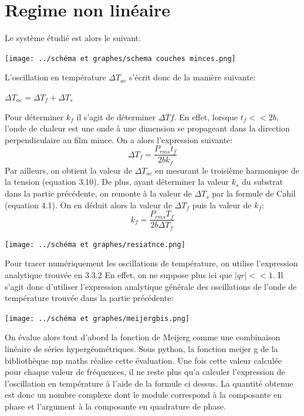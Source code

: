 \documentclass[10pt,a4paper]{report}
\begin{document}
\section{Regime non linéaire}
Le système étudié est alors le suivant:
\begin{center}
\texttt{[image: ../schéma et graphes/schema couches minces.png]} 
\end{center}
L'oscillation en température $\Delta T_{ac}$ s'écrit donc de la manière suivante:
\begin{center}
$\Delta T_{ac}=\Delta T_{f}+\Delta T_{s}$
\end{center}
Pour déterminer $k_{f}$ il s'agit de déterminer $\Delta T{f}$. En effet, lorsque $t_{f}<<2b$, l'onde de chaleur est une onde à une dimension se propageant dans la direction perpendiculaire au film mince. On a alors l'expression suivante:
\begin{equation}
\Delta T_{f}=\frac{P_{rms}t_{f}}{2bk_{f}}
\end{equation}
Par ailleurs, on obtient la valeur de $\Delta T_{ac}$ en mesurant le troisième harmonique de la tension (equation 3.10).
De plus, ayant déterminer la valeur $k_{s}$ du substrat dans la partie précédente, on remonte à la valeur de $\Delta T_{s}$ par la formule de Cahil (equation 4.1). On en déduit alors la valeur de $\Delta T_{f}$ puis la valeur de $k_{f}$:
\begin{equation}
k_{f}=\frac{P_{rms}T_{f}}{2b\Delta T_{f}}
\end{equation}
\begin{center}
\texttt{[image: ../schéma et graphes/resiatnce.png]}
\end{center}
Pour tracer numériquement les oscillations de température, on utilise l'expression analytique trouvée en 3.3.2
En effet, on ne suppose plus ici que $\lvert qr\rvert<<1$. Il s'agit donc d'utiliser l'expression analytique générale des oscillations de l'onde de température trouvée dans la partie précédente:
\begin{center}
\texttt{[image: ../schéma et graphes/meijergbis.png]} 
\end{center}
On évalue alors tout d'abord la fonction de Meijerg comme une combinaison linéaire de séries hypergéométriques. Sous python, la fonction meijer g de la bibliothèque mp maths réalise cette évaluation. Une fois cette valeur calculée pour chaque valeur de fréquences, il ne reste plus qu'a calculer l'expression de l'oscillation en température à l'aide de la formule ci dessus. La quantité obtenue est donc un nombre complexe dont le module correspond à la composante en phase et l'argument à la composante en quadrature de phase. 
\end{document}
